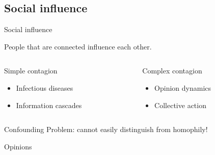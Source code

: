 \documentclass[hide notes,compress]{beamer}
\begin{document}
\subsection{Social influence}

\begin{frame}[c]{Social influence}

  People that are connected influence each other.

  \vskip1cm

  \begin{columns}
    \begin{column}{.47\textwidth}
      \begin{block}{Simple contagion}
        \begin{itemize}
          \item Infectious diseases
          \item Information cascades
        \end{itemize}
      \end{block}
    \end{column}
    \begin{column}{.47\textwidth}
      \begin{block}{Complex contagion}
        \begin{itemize}
          \item Opinion dynamics
          \item Collective action
        \end{itemize}
      \end{block}
    \end{column}
  \end{columns}

  \vskip1cm

  \begin{alertblock}{Confounding}
    Problem: cannot easily distinguish from homophily!
  \end{alertblock}

\end{frame}

\begin{frame}[label=opinions,t]{Opinions}
  \begin{center}
  \end{center}
\end{frame}
\end{document}
